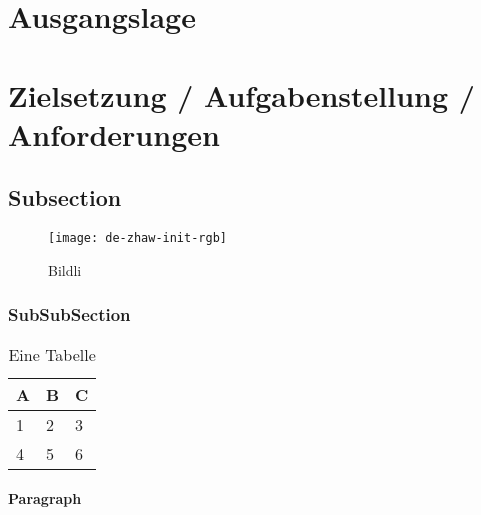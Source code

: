 \section{Ausgangslage}
\lipsum[1] \cite{quelle2}

\section{Zielsetzung / Aufgabenstellung / Anforderungen}
\lipsum[1] \cite{quelle2}

\subsection{Subsection}
\lipsum[1] \cite{quelle1}

\begin{figure}[H]
\centering
\texttt{[image: de-zhaw-init-rgb]}
\caption{Bildli}
\label{fig:bildli1}
\end{figure}


\subsubsection{SubSubSection}
\lipsum[1]
\begin{table}[H]
\centering
\caption{Eine Tabelle}
\label{tab:my-table}
\begin{tabular}{|l|l|l|}
\hline
\textbf{A} & \textbf{B} & \textbf{C} \\ \hline
1          & 2          & 3          \\ \hline
4          & 5          & 6          \\ \hline
\end{tabular}
\end{table}

\paragraph{Paragraph}
\lipsum[1]

 


